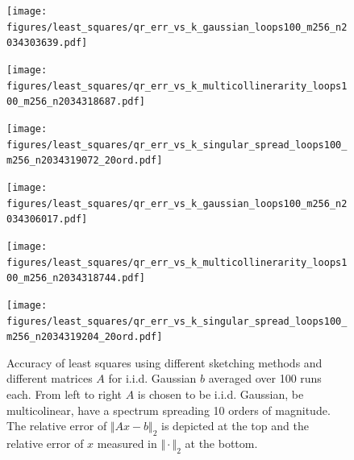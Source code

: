 \documentclass{article}
\begin{document}
\begin{figure}[htb]
  \centering
  \begin{minipage}[t]{.32\linewidth}
    \centering
    \texttt{[image: figures/least\_squares/qr\_err\_vs\_k\_gaussian\_loops100\_m256\_n2034303639.pdf]}
  \end{minipage}
  \begin{minipage}[t]{.32\linewidth}
    \centering
    \texttt{[image: figures/least\_squares/qr\_err\_vs\_k\_multicollinerarity\_loops100\_m256\_n2034318687.pdf]}
  \end{minipage}
  \begin{minipage}[t]{.32\linewidth}
    \centering
    \texttt{[image: figures/least\_squares/qr\_err\_vs\_k\_singular\_spread\_loops100\_m256\_n2034319072\_20ord.pdf]}
  \end{minipage}
  \begin{minipage}[t]{.32\linewidth}
    \centering
    \texttt{[image: figures/least\_squares/qr\_err\_vs\_k\_gaussian\_loops100\_m256\_n2034306017.pdf]}
  \end{minipage}
  \begin{minipage}[t]{.32\linewidth}
    \centering
    \texttt{[image: figures/least\_squares/qr\_err\_vs\_k\_multicollinerarity\_loops100\_m256\_n2034318744.pdf]}
  \end{minipage}
  \begin{minipage}[t]{.32\linewidth}
    \centering
    \texttt{[image: figures/least\_squares/qr\_err\_vs\_k\_singular\_spread\_loops100\_m256\_n2034319204\_20ord.pdf]}
  \end{minipage}
  \caption{Accuracy of least squares using different sketching methods and different matrices $A$ for i.i.d. Gaussian $b$ averaged over 100 runs each. From left to right $A$ is chosen to be i.i.d. Gaussian, be multicolinear, have a spectrum spreading 10 orders of magnitude. The relative error of $\Vert Ax-b\Vert_2$ is depicted at the top and the relative error of $x$ measured in $\Vert \cdot \Vert_2$ at the bottom.}
  \label{fig:qr_results}
\end{figure}
\end{document}
